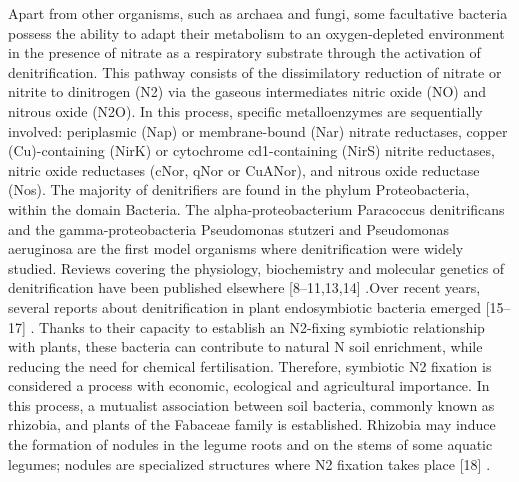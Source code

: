 \documentclass[12pt]{article}
\begin{document}
Apart from other organisms, such as archaea and fungi, some facultative bacteria
possess the ability to adapt their metabolism to an oxygen-depleted environment in the
presence of nitrate as a respiratory substrate through the activation of denitrification. This
pathway consists of the dissimilatory reduction of nitrate or nitrite to
dinitrogen (N2) via the gaseous intermediates nitric oxide (NO) and nitrous oxide (N2O).
In this process, specific metalloenzymes are sequentially involved: periplasmic (Nap) or
membrane-bound (Nar) nitrate reductases, copper (Cu)-containing (NirK) or cytochrome
cd1-containing (NirS) nitrite reductases, nitric oxide reductases (cNor, qNor or CuANor),
and nitrous oxide reductase (Nos). The majority of denitrifiers are found in the phylum
Proteobacteria, within the domain Bacteria. The alpha-proteobacterium Paracoccus denitrificans
and the 
gamma-proteobacteria Pseudomonas stutzeri and Pseudomonas aeruginosa are the
first model organisms where denitrification were widely studied. Reviews covering the
physiology, biochemistry and molecular genetics of denitrification have been published
elsewhere [8–11,13,14] \cite{zumft1997cell}\cite{vannitrogen}\cite{van2007introduction}\cite{kraft2011microbial}\cite{bueno2012bacterial}\cite{torres2016nitrous}.Over recent years, several reports about denitrification in plant endosymbiotic
bacteria emerged [15–17] \cite{bedmar2005complete}\cite{bedmar2013ecology}\cite{salas2021bacterial}. Thanks to their capacity to establish an N2-fixing symbiotic
relationship with plants, these bacteria can contribute to natural N soil enrichment, while
reducing the need for chemical fertilisation. Therefore, symbiotic N2 fixation is considered a
process with economic, ecological and agricultural importance. In this process, a mutualist
association between soil bacteria, commonly known as rhizobia, and plants of the Fabaceae
family is established. Rhizobia may induce the formation of nodules in the legume roots
and on the stems of some aquatic legumes; nodules are specialized structures where N2
fixation takes place [18] \cite{poole2018rhizobia}.
\end{document}
